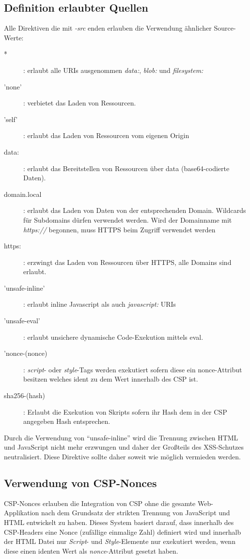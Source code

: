 \subsection{Definition erlaubter Quellen}

Alle Direktiven die mit \textit{-src} enden erlauben die Verwendung ähnlicher Source-Werte:

\begin{description}
	\item[*]: erlaubt alle URIs ausgenommen \textit{data:}, \textit{blob:} und \textit{filesystem:}
	\item['none']: verbietet das Laden von Ressourcen.
	\item['self']: erlaubt das Laden von Ressourcen vom eigenen Origin
	\item[data:]: erlaubt das Bereitstellen von Ressourcen über data (base64-codierte Daten).
	\item[domain.local]: erlaubt das Laden von Daten von der entsprechenden Domain. Wildcards für Subdomains dürfen verwendet werden. Wird der Domainname mit \textit{https://} begonnen, muss HTTPS beim Zugriff verwendet werden
	\item[https:]: erzwingt das Laden von Ressourcen über HTTPS, alle Domains sind erlaubt.
	\item['unsafe-inline']: erlaubt inline Javascript als auch \textit{javascript:} URIs
	\item['unsafe-eval']: erlaubt unsichere dynamische Code-Exekution mittels eval.
	\item['nonce-(nonce)]: \textit{script}- oder \textit{style}-Tags werden exekutiert sofern diese ein nonce-Attribut besitzen welches ident zu dem Wert innerhalb des CSP ist.
	\item[sha256-(hash)]: Erlaubt die Exekution von Skripts sofern ihr Hash dem in der CSP angegeben Hash entsprechen.
\end{description}

Durch die Verwendung von ``unsafe-inline'' wird die Trennung zwischen HTML und JavaScript nicht mehr erzwungen und daher der Großteils des XSS-Schutzes neutralisiert. Diese Direktive sollte daher soweit wie möglich vermieden werden.

\subsection{Verwendung von CSP-Nonces}

CSP-Nonces erlauben die Integration von CSP ohne die gesamte Web-Applikation nach dem Grundsatz der strikten Trennung von JavaScript und HTML entwickelt zu haben. Dieses System basiert darauf, dass innerhalb des CSP-Headers eine Nonce (zufällige einmalige Zahl) definiert wird und innerhalb der HTML Datei nur \textit{Script}- und \textit{Style}-Elemente nur exekutiert werden, wenn diese einen identen Wert als \textit{nonce}-Attribut gesetzt haben.

